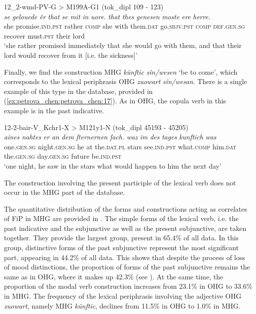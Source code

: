 \documentclass[output=paper,colorlinks,citecolor=brown]{langscibook}
\begin{document}
\ex \label{ex:petrova_chen:petrova_chen:16d} 12\_2-wmd-PV-G > M199A-G1 (tok\_dipl 109 - 123)\\
\gll \textit{se} \textit{gelouede} \textit{êr} \textit{that} \textit{se} \textit{mit} \textit{in} \textit{uore.} \textit{that} \textit{thes} \textit{genesen} \textit{moste} \textit{ere} \textit{herre.}\\
she promise.\textsc{ind.pst} rather \textsc{comp} she with them.\textsc{dat} go.\textsc{sbjv.pst} \textsc{comp} \textsc{def.gen.sg} recover must.\textsc{pst} their lord\\
\glt ‘she rather promised immediately that she would go with them, and that their lord would recover from it [i.e. the sickness]’
\z
\z

\noindent Finally, we find the construction MHG \textit{künftic sîn/wesen} ‘be to come’, which corresponds to the lexical periphrasis OHG \textit{zuowart sîn/wesan}. There is a single example of this type in the database, provided in (\ref{ex:petrova_chen:petrova_chen:17}). As in OHG, the copula verb in this example is in the past indicative.

\ea \label{ex:petrova_chen:petrova_chen:17} 12-2-bair-V\_Kchr1-X > M121y1-N (tok\_dipl 45193 - 45205)\\
\gll \textit{aines} \textit{nahtes} \textit{er} \textit{an} \textit{dem} \textit{ſternernen} \textit{ſach.} \textit{waz} \textit{im} \textit{des} \textit{tages} \textit{kunftich} \textit{was}\\
one.\textsc{gen.sg} night.\textsc{gen.sg} he at the.\textsc{dat.pl} stars see.\textsc{ind.pst} what.\textsc{comp} him.\textsc{dat} the.\textsc{gen.sg} day.\textsc{gen.sg} future be.\textsc{ind.pst}\\
\glt ‘one night, he saw in the stars what would happen to him the next day’
\z

The construction involving the present participle of the lexical verb does not occur in the MHG part of the database.

The quantitative distribution of the forms and constructions acting as correlates of FiP in MHG are provided in . The simple forms of the lexical verb, i.e. the past indicative and the subjunctive as well as the present subjunctive, are taken together. They provide the largest group, present in 65.4\% of all data. In this group, distinctive forms of the past subjunctive represent the most significant part, appearing in 44.2\% of all data. This shows that despite the process of loss of mood distinctions, the proportion of forms of the past subjunctive remains the same as in OHG, where it makes up 42.3\% (see ). At the same time, the proportion of the modal verb construction increases from 23.1\% in OHG to 33.6\% in MHG. The frequency of the lexical periphrasis involving the adjective OHG \textit{zuowart}, namely MHG \textit{künftic}, declines from 11.5\% in OHG to 1.0\% in MHG.
\end{document}

